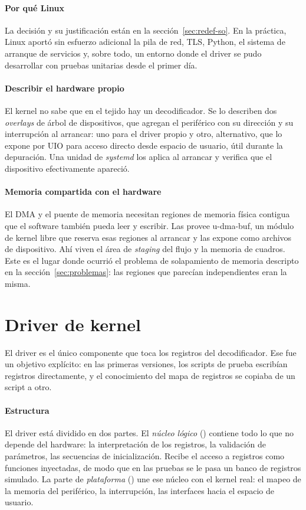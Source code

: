 \paragraph{Por qué Linux}
La decisión y su justificación están en la sección~\ref{sec:redef-so}. En
la práctica, Linux aportó sin esfuerzo adicional la pila de red, TLS,
Python, el sistema de arranque de servicios y, sobre todo, un entorno donde
el driver se pudo desarrollar con pruebas unitarias desde el primer día.

\paragraph{Describir el hardware propio}
El kernel no sabe que en el tejido hay un decodificador. Se lo describen dos
\emph{overlays} de árbol de dispositivos, que agregan el periférico con su
dirección y su interrupción al arrancar: uno para el driver propio y otro,
alternativo, que lo expone por UIO para acceso directo desde espacio de
usuario, útil durante la depuración. Una unidad de \emph{systemd} los aplica
al arrancar y verifica que el dispositivo efectivamente apareció.

\paragraph{Memoria compartida con el hardware}
El DMA y el puente de memoria necesitan regiones de memoria física contigua
que el software también pueda leer y escribir. Las provee u-dma-buf, un
módulo de kernel libre que reserva esas regiones al arrancar y las expone
como archivos de dispositivo. Ahí viven el área de \emph{staging} del flujo
y la memoria de cuadros. Este es el lugar donde ocurrió el problema de
solapamiento de memoria descripto en la sección~\ref{sec:problemas}: las
regiones que parecían independientes eran la misma.

\section{Driver de kernel}
\label{sec:driver}

El driver  es el único componente que toca los registros
del decodificador. Ese fue un objetivo explícito: en las primeras versiones,
los scripts de prueba escribían registros directamente, y el conocimiento del
mapa de registros se copiaba de un script a otro.

\paragraph{Estructura}
El driver está dividido en dos partes. El \emph{núcleo lógico}
() contiene todo lo que no depende del hardware:
la interpretación de los registros, la validación de parámetros, las
secuencias de inicialización. Recibe el acceso a registros como funciones
inyectadas, de modo que en las pruebas se le pasa un banco de registros
simulado. La parte de \emph{plataforma} () une ese
núcleo con el kernel real: el mapeo de la memoria del periférico, la
interrupción, las interfaces hacia el espacio de usuario.

